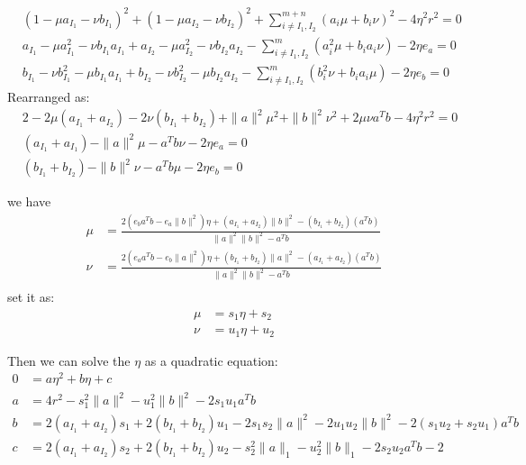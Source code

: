 \documentclass[twoside]{article}
\theoremstyle{plain}
\newcommand{\tranT}{T}
\begin{document}
\begin{equation}
\begin{split} 
 & (1-\mu a_{I_1}-\nu b_{I_1})^2 + (1-\mu a_{I_2}-\nu b_{I_2})^2 + \sum^{m+n}_{i\neq I_1,I_2}(a_i\mu+b_i\nu)^2 - 4\eta^2 r^2 = 0 \\
 & a_{I_1}-\mu a_{I_1}^2-\nu b_{I_1}a_{I_1} + a_{I_2}-\mu a_{I_2}^2-\nu b_{I_2}a_{I_2} - \sum^{m}_{i\neq I_1,I_2}(a_i^2\mu +b_i a_i\nu) - 2\eta {e_a} = 0 \\
 & b_{I_1}-\nu b_{I_1}^2-\mu b_{I_1}a_{I_1} + b_{I_2}-\nu b_{I_2}^2-\mu b_{I_2}a_{I_2} - \sum^{m}_{i\neq I_1,I_2}(b_i^2\nu +b_i a_i\mu) - 2\eta {e_b} = 0 
 \end{split}
\end{equation}
Rearranged as:
\begin{equation}
\begin{split} 
 & 2-2\mu (a_{I_1}+a_{I_2})-2\nu(b_{I_1}+b_{I_2})+ \|a\|^2\mu^2+\|b\|^2\nu^2+2\mu\nu a^{\tranT}b - 4\eta^2 r^2 = 0 \\
 & (a_{I_1}+ a_{I_1}) - \|a\|^2\mu - a^{\tranT}b\nu - 2\eta {e_a} = 0 \\
 & (b_{I_1}+ b_{I_2}) - \|b\|^2\nu - a^{\tranT}b \mu - 2\eta {e_b} = 0 
 \end{split}
\end{equation}

we have 
\begin{equation}
\begin{split} 
\mu &= \frac{2( e_ba^{\tranT}b - e_a\|b\|^2 )\eta + (a_{I_1}+a_{I_2}) \|b\|^2 - (b_{I_1} + b_{I_2}) (a^{\tranT}b)}{ \|a\|^2 \|b\|^2 -a^{\tranT}b}\\
\nu &=\frac{2( e_aa^{\tranT}b - e_b\|a\|^2 )\eta + (b_{I_1}+b_{I_2}) \|a\|^2 - (a_{I_1} + a_{I_2}) (a^{\tranT}b)}{ \|a\|^2 \|b\|^2 -a^{\tranT}b}\\
 \end{split}
\end{equation}
set it as:
\begin{equation}
\begin{split} 
\mu &= s_1 \eta + s_2\\ 
\nu &= u_1 \eta + u_2
 \end{split}
 \label{eq:final}
\end{equation}

Then we can solve the $\eta$ as a quadratic equation:
\begin{equation}
\begin{split} 
0&=a\eta^2+b\eta+c\\
 a&= 4r^2 - s_1^2\|a\|^2 - u_1^2\|b\|^2 -2s_1 u_1a^{\tranT}b\\
b&=2(a_{I_1} + a_{I_2})s_1 +2(b_{I_1} + b_{I_2})u_1 - 2s_1s_2 \|a\|^2 - 2u_1u_2\|b\|^2 - 2(s_1u_2+s_2u_1)a^{\tranT}b \\
 c&=2(a_{I_1} + a_{I_2})s_2 +2(b_{I_1} + b_{I_2})u_2 -s_2^2\|a\|_1 -u_2^2\|b\|_1 - 2s_2u_2a^{\tranT}b -2
 \end{split}
\end{equation}
\end{document}
